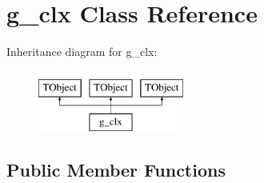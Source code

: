 \hypertarget{classg__clx}{}\section{g\+\_\+clx Class Reference}
\label{classg__clx}
Inheritance diagram for g\+\_\+clx\+:\begin{figure}[H]
\begin{center}
\leavevmode
\includegraphics[height=2.000000cm]{classg__clx}
\end{center}
\end{figure}
\subsection*{Public Member Functions}
